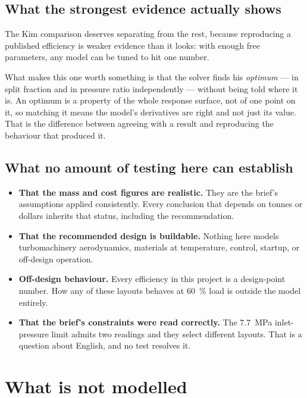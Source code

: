 \documentclass[11pt,a4paper]{report}
\begin{document}
\section{What the strongest evidence actually shows}

The Kim comparison deserves separating from the rest, because
reproducing a published efficiency is weaker evidence than it looks:
with enough free parameters, any model can be tuned to hit one number.

What makes this one worth something is that the solver finds his
\emph{optimum} --- in split fraction and in pressure ratio
independently --- without being told where it is. An optimum is a
property of the whole response surface, not of one point on it, so
matching it means the model's derivatives are right and not just its
value. That is the difference between agreeing with a result and
reproducing the behaviour that produced it.

\section{What no amount of testing here can establish}

\begin{itemize}\itemsep3pt
\item \textbf{That the mass and cost figures are realistic.} They are
      the brief's assumptions applied consistently. Every conclusion
      that depends on tonnes or dollars inherits that status, including
      the recommendation.
\item \textbf{That the recommended design is buildable.} Nothing here
      models turbomachinery aerodynamics, materials at temperature,
      control, startup, or off-design operation.
\item \textbf{Off-design behaviour.} Every efficiency in this project
      is a design-point number. How any of these layouts behaves at
      \SI{60}{\percent} load is outside the model entirely.
\item \textbf{That the brief's constraints were read correctly.} The
      \SI{7.7}{\mega\pascal} inlet-pressure limit admits two readings
      and they select different layouts. That is a question about
      English, and no test resolves it.
\end{itemize}

\chapter{What is not modelled}
\label{ch:notmodelled}
\end{document}
